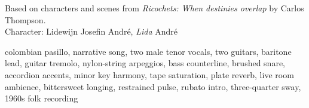 
\begin{notes}
Based on characters and scenes from \emph{Ricochets: When destinies overlap} by Carlos Thompson.\\
Character: Lidewijn Josefin André, \emph{Lida} André
\end{notes}
\begin{style}
colombian pasillo, narrative song, two male tenor vocals, two guitars, baritone lead, guitar tremolo, nylon-string arpeggios, bass counterline, brushed snare, accordion accents, minor key harmony, tape saturation, plate reverb, live room ambience, bittersweet longing, restrained pulse, rubato intro, three-quarter sway, 1960s folk recording
\end{style}
